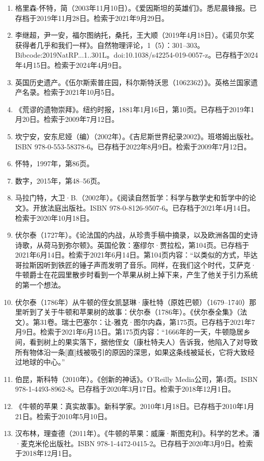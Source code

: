 \begin{enumerate}
\item 格里森-怀特，简（2003年11月10日）。《爱因斯坦的英雄们》。悉尼晨锋报。已存档于2019年11月28日。检索于2021年9月29日。
\item 李继超，尹一安，福尔图纳托，桑托，王大顺（2019年4月18日）。《诺贝尔奖获得者几乎和我们一样》。自然物理评论，1（5）：301–303。Bibcode:2019NatRP...1..301L。doi:10.1038/s42254-019-0057-z。已存档于2024年4月15日。检索于2024年4月9日。  
\item 英国历史遗产。《伍尔斯索普庄园，科尔斯特沃思（1062362）》。英格兰国家遗产名录。检索于2021年10月5日。  
\item 《荒谬的遗物崇拜》。纽约时报，1881年1月16日，第10页。已存档于2019年1月20日。检索于2009年7月12日。  
\item 坎宁安，安东尼娅（编）（2002年）。《吉尼斯世界纪录2002》。班塔姆出版社。ISBN 978-0-553-58378-6。已存档于2022年8月9日。检索于2009年7月12日。
\item 怀特，1997年，第86页。  
\item 数字，2015年，第48–56页。  
\item 马拉门特，大卫·B.（2002年）。《阅读自然哲学：科学与数学史和哲学中的论文》。开放法庭出版社。ISBN 978-0-8126-9507-6。已存档于2021年4月14日。检索于2020年10月18日。  
\item 伏尔泰（1727年）。《论法国的内战，从珍贵手稿中摘录，以及欧洲各国的史诗诗歌，从荷马到弥尔顿》。英国伦敦：塞缪尔·贾拉松，第104页。已存档于2021年6月14日。检索于2021年6月14日。第104页内容：“以类似的方式，毕达哥拉斯因听到铁匠的锤子声而发明了音乐。同样，在我们这个时代，艾萨克·牛顿爵士在花园里散步时看到一个苹果从树上掉下来，产生了他关于引力系统的第一个想法。
\item 伏尔泰（1786年）从牛顿的侄女凯瑟琳·康杜特（原姓巴顿）（1679–1740）那里听到了关于牛顿和苹果树的故事：伏尔泰（1786年）。《伏尔泰全集》（法文）。第31卷。瑞士巴塞尔：让-雅克·图尔内森，第175页。已存档于2021年7月9日。检索于2021年6月15日。第175页内容：“1666年的一天，牛顿隐居乡间，看到树上的果实落下，据他侄女（康杜特夫人）告诉我，他陷入了对导致所有物体沿一条[直]线被吸引的原因的深思，如果这条线被延长，它将大致经过地球的中心。”  
\item 伯昆，斯科特（2010年）。《创新的神话》。O'Reilly Media公司，第4页。ISBN 978-1-4493-8962-8。已存档于2020年3月17日。检索于2018年12月1日。  
\item 《牛顿的苹果：真实故事》。新科学家。2010年1月18日。已存档于2010年1月21日。检索于2010年5月10日。  
\item 汉布林，理查德（2011年）。《牛顿的苹果：威廉·斯图克利》。科学的艺术。潘·麦克米伦出版社。ISBN 978-1-4472-0415-2。已存档于2020年3月9日。检索于2018年12月1日。

\end{enumerate}

